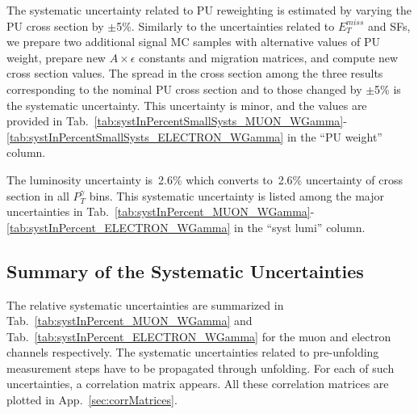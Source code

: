 

The systematic uncertainty related to PU reweighting is estimated by varying the PU cross section by $\pm$5\%. Similarly to the uncertainties related to $E_T^{miss}$ and SFs, we prepare two additional signal MC samples with alternative values of PU weight, prepare new $A \times \epsilon$ constants and migration matrices, and compute new cross section values. The spread in the cross section among the three results corresponding to the nominal PU cross section and to those changed by $\pm$5\% is the systematic uncertainty. This uncertainty is minor, and the values are provided in Tab.~\ref{tab:systInPercentSmallSysts_MUON_WGamma}-\ref{tab:systInPercentSmallSysts_ELECTRON_WGamma} in the ``PU weight'' column.

The luminosity uncertainty is~2.6\% which converts to~2.6\% uncertainty of cross section in all $P_T^{\gamma}$ bins. This systematic uncertainty is listed among the major uncertainties in Tab.~\ref{tab:systInPercent_MUON_WGamma}-\ref{tab:systInPercent_ELECTRON_WGamma} in the ``syst lumi'' column.

\subsection{Summary of the Systematic Uncertainties}
\label{sec:Systematics_summary}

The relative systematic uncertainties are summarized in Tab.~\ref{tab:systInPercent_MUON_WGamma} and Tab.~\ref{tab:systInPercent_ELECTRON_WGamma} for the muon and electron channels respectively. The systematic uncertainties related to pre-unfolding measurement steps have to be propagated through unfolding. For each of such uncertainties, a correlation matrix appears. All these correlation matrices are plotted in App.~\ref{sec:corrMatrices}.

